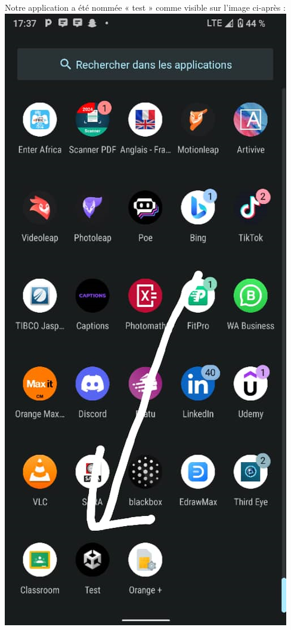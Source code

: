 \documentclass[a4paper, 13px]{article}
\begin{document}
Notre application a été nommée « test » comme visible sur l’image ci-après :\\
\includegraphics[scale=0.4]{img8.png}\\
\end{document}
